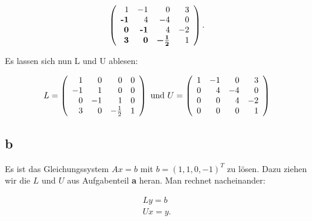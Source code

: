 \documentclass[12pt]{article}
\begin{document}
$$
\left(
	\begin{array}{r r r r}
		 1	 	&	 -1		&	  0		&	 3	\\
		\textbf{-1}		&	  4		&	 -4		&	 0	\\
		 \textbf{0}	 	&	 \textbf{-1}		&	  4		&	-2	\\
		 \textbf{3}	 	&	 \textbf{0}		&	 \boldsymbol{-\frac{1}{2} }		&	 1	\\
	\end{array}
\right ) .
$$

Es lassen sich nun L und U ablesen:

$$
L = \left ( \begin{array}{r r r r} 
 1	&	 0	& 0 & 0 \\
-1  &  1  & 0 & 0 \\
 0  & -1  & 1 & 0 \\ 
 3  &  0  & -\frac{1}{2} & 1 \\ 
\end{array}  \right ) \text{ und } U = 
\left ( \begin{array}{r r r r} 
 1	&	 -1	 &  0 &  3 \\
 0  &   4  & -4 &  0 \\
 0  &   0  &  4 & -2 \\ 
 0  &   0  &  0 &  1 \\ 
\end{array}  \right ) 
$$

\newpage
\subsection*{b}
Es ist das Gleichungssystem $Ax=b$ mit $b = (1 ,1,0,-1)^T$ zu lösen. Dazu ziehen wir die
$L$ und $U$ aus Aufgabenteil \textbf{a} heran. Man rechnet nacheinander:


\begin{eqnarray*} 
Ly = b \\
Ux = y.
\end{eqnarray*} 
\end{document}
